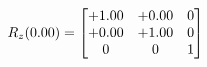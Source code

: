 \documentclass[preview]{standalone}
\begin{document}
\begin{align*}
\special{dvisvgm:raw <g id='unique000'>}R_{z}(0.00) = \begin{bmatrix}+1.00 & +0.00 & 0 \\+0.00 & +1.00 & 0 \\0 & 0 & 1\end{bmatrix}\special{dvisvgm:raw </g>}
\end{align*}
\end{document}
